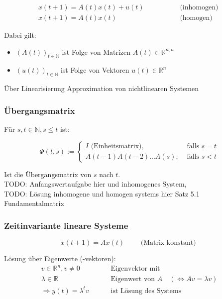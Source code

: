 \documentclass[a4paper]{article}
\newcommand{\R}{\mathbb{R}}
\newcommand{\N}{\mathbb{N}}
\begin{document}
\begin{align*}
	x(t+1) = A(t) x(t) + u(t)
	\qquad \qquad & \text{ (inhomogen) } \\
	x(t+1) = A(t) x(t)
	\qquad \qquad & \text{ (homogen) }
\end{align*}

Dabei gilt:

\begin{itemize}
	\item $(A(t))_{t \in \mathbb{N}}$
		ist Folge von Matrizen $A(t) \in \R ^{n, n}$
	\item $(u(t))_{t \in \mathbb{N}}$ ist Folge von Vektoren 
		$u(t) \in \R ^{n}$
\end{itemize}

Über Linearisierung Approximation von nichtlinearen Systemen
\\

\subsubsection{Übergangsmatrix}

Für $s, t \in \N, s \leq t$ ist:

\[
	\Phi(t, s) := 
	\begin{cases}
		I \text{ (Einheitsmatrix)}, 
		& \text{ falls } s = t \\
		A(t-1) A(t-2) ... A(s),
		& \text{ falls } s < t
	\end{cases}
\] 

Ist die Übergangsmatrix von $s$ nach $t$.
\\

TODO: Anfangswertaufgabe hier und inhomogenes System,
\\

TODO: Lösung inhomogene und homogen systems hier Satz 5.1
Fundamentalmatrix

\subsubsection{Zeitinvariante lineare Systeme}

\[
	x(t+1) = A x(t)
	\qquad \text{ (Matrix konstant) }
\] 

Lösung über Eigenwerte (-vektoren):
\begin{align*}
	v \in \R ^{n}, v \ne 0 \qquad
	& \text{ Eigenvektor mit } \\
	\lambda \in \R \qquad
	& \text{ Eigenwert von } A
	\quad ( \Leftrightarrow  Av = \lambda v ) \\
	\Rightarrow y(t) = \lambda ^{t} v \qquad
	& \text{ ist Lösung des Systems }
\end{align*}
\end{document}
